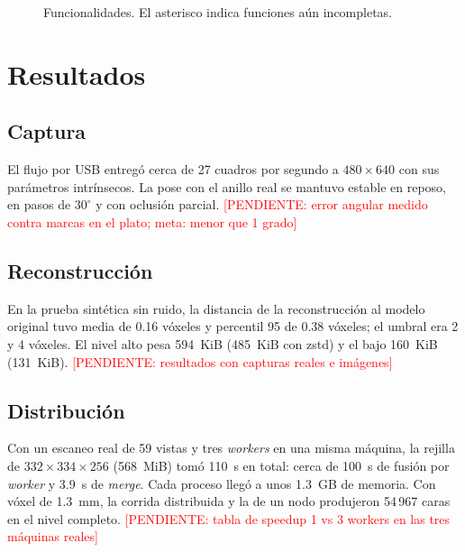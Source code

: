 \documentclass[journal]{IEEEtran}
\newcommand{\pendiente}[1]{\textcolor{red}{[PENDIENTE: #1]}}
\begin{document}
\begin{figure}[!t]
\centering
{}
\caption{Funcionalidades. El asterisco indica funciones aún incompletas.}
\label{fig:funciones}
\end{figure}

\section{Resultados}

\subsection{Captura}
El flujo por USB entregó cerca de 27 cuadros por segundo a $480\times640$ con sus
parámetros intrínsecos. La pose con el anillo real se mantuvo estable en reposo,
en pasos de $30^{\circ}$ y con oclusión parcial.
\pendiente{error angular medido contra marcas en el plato; meta: menor que 1 grado}

\subsection{Reconstrucción}
En la prueba sintética sin ruido, la distancia de la reconstrucción al modelo
original tuvo media de 0.16 vóxeles y percentil 95 de 0.38 vóxeles; el umbral
era 2 y 4 vóxeles. El nivel alto pesa 594~KiB (485~KiB con zstd) y el bajo
160~KiB (131~KiB). \pendiente{resultados con capturas reales e imágenes}

\subsection{Distribución}
Con un escaneo real de 59 vistas y tres \emph{workers} en una misma máquina, la
rejilla de $332\times334\times256$ (568~MiB) tomó 110~s en total: cerca de 100~s
de fusión por \emph{worker} y 3.9~s de \emph{merge}. Cada proceso llegó a unos
1.3~GB de memoria. Con vóxel de 1.3~mm, la corrida distribuida y la de un nodo
produjeron 54\,967 caras en el nivel completo.
\pendiente{tabla de speedup 1 vs 3 workers en las tres máquinas reales}
\end{document}
